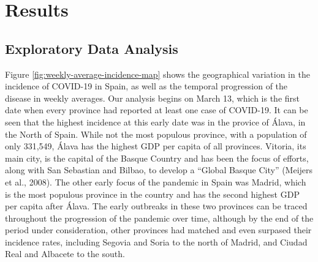 \documentclass[]{elsarticle} %
\begin{document}
\hypertarget{results}{%
\section{Results}\label{results}}

\hypertarget{eda}{%
\subsection{Exploratory Data Analysis}\label{eda}}

Figure \ref{fig:weekly-average-incidence-map} shows the geographical
variation in the incidence of COVID-19 in Spain, as well as the temporal
progression of the disease in weekly averages. Our analysis begins on
March 13, which is the first date when every province had reported at
least one case of COVID-19. It can be seen that the highest incidence at
this early date was in the provice of Álava, in the North of Spain.
While not the most populous province, with a population of only 331,549,
Álava has the highest GDP per capita of all provinces. Vitoria, its main
city, is the capital of the Basque Country and has been the focus of
efforts, along with San Sebastian and Bilbao, to develop a ``Global
Basque City'' (Meijers et al., 2008). The other early focus of the
pandemic in Spain was Madrid, which is the most populous province in the
country and has the second highest GDP per capita after Álava. The early
outbreaks in these two provinces can be traced throughout the
progression of the pandemic over time, although by the end of the period
under consideration, other provinces had matched and even surpased their
incidence rates, including Segovia and Soria to the north of Madrid, and
Ciudad Real and Albacete to the south.
\end{document}
